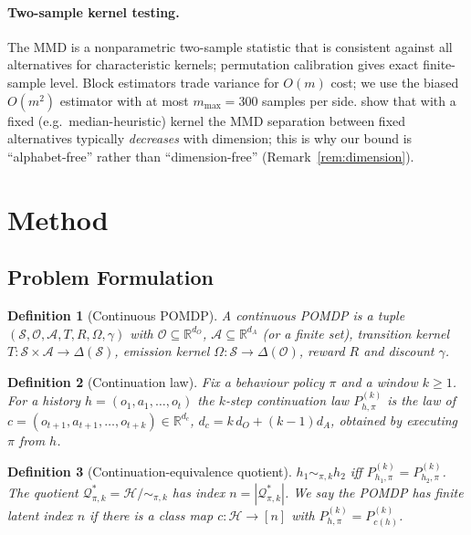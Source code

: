 \documentclass[10pt]{article}
\newtheorem{definition}{Definition}
\newcommand{\calH}{\mathcal{H}}
\newcommand{\calO}{\mathcal{O}}
\newcommand{\calA}{\mathcal{A}}
\newcommand{\calS}{\mathcal{S}}
\newcommand{\bbR}{\mathbb{R}}
\newcommand{\Qstar}{\mathcal{Q}^*}
\begin{document}
\paragraph{Two-sample kernel testing.}
The MMD \citep{Gretton2012} is a nonparametric two-sample statistic that is
consistent against all alternatives for characteristic kernels; permutation
calibration gives exact finite-sample level.  Block estimators
\citep{Zaremba2013} trade variance for $O(m)$ cost; we use the biased
$O(m^2)$ estimator with at most $m_{\max}=300$ samples per side.
\citet{Ramdas2015} show that with a fixed (e.g.\ median-heuristic) kernel the
MMD separation between fixed alternatives typically \emph{decreases} with
dimension; this is why our bound is ``alphabet-free'' rather than
``dimension-free'' (Remark~\ref{rem:dimension}).

\section{Method}
\label{sec:method}

\subsection{Problem Formulation}

\begin{definition}[Continuous POMDP]
A continuous POMDP is a tuple $(\calS,\calO,\calA,T,R,\Omega,\gamma)$ with
$\calO\subseteq\bbR^{d_O}$, $\calA\subseteq\bbR^{d_A}$ (or a finite set),
transition kernel $T:\calS\times\calA\to\Delta(\calS)$, emission kernel
$\Omega:\calS\to\Delta(\calO)$, reward $R$ and discount $\gamma$.
\end{definition}

\begin{definition}[Continuation law]
Fix a behaviour policy $\pi$ and a window $k\ge1$.  For a history
$h=(o_1,a_1,\dots,o_t)$ the \emph{$k$-step continuation law}
$P^{(k)}_{h,\pi}$ is the law of $c=(o_{t+1},a_{t+1},\dots,o_{t+k})\in\bbR^{d_c}$,
$d_c=k\,d_O+(k{-}1)d_A$, obtained by executing $\pi$ from $h$.
\end{definition}

\begin{definition}[Continuation-equivalence quotient]
$h_1\sim_{\pi,k}h_2$ iff $P^{(k)}_{h_1,\pi}=P^{(k)}_{h_2,\pi}$.  The quotient
$\Qstar_{\pi,k}=\calH/{\sim_{\pi,k}}$ has index $n=|\Qstar_{\pi,k}|$.  We say
the POMDP has \emph{finite latent index $n$} if there is a class map
$c:\calH\to[n]$ with $P^{(k)}_{h,\pi}=P^{(k)}_{c(h)}$.
\end{definition}
\end{document}
